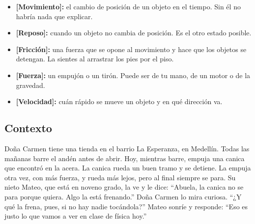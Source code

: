\documentclass[
  spanish,
  letterpaper,
  12pt,
  oneside,
  open=any,
  DIV=15]{scrbook}
\providecommand{\tightlist}{%
  \setlength{\itemsep}{0pt}\setlength{\parskip}{0pt}}
\begin{document}
\begin{tcolorbox}[enhanced jigsaw, arc=.35mm, bottomrule=.15mm, bottomtitle=1mm, breakable, colback=white, colbacktitle=quarto-callout-tip-color!10!white, colframe=quarto-callout-tip-color-frame, coltitle=black, left=2mm, leftrule=.75mm, opacityback=0, opacitybacktitle=0.6, rightrule=.15mm, title=\textcolor{quarto-callout-tip-color}{\faLightbulb}\hspace{0.5em}{Apoyo Procedimental (Vocabulario Clave)}, titlerule=0mm, toprule=.15mm, toptitle=1mm]

\begin{itemize}
\tightlist
\item
  \textbf{{[}Movimiento{]}:} el cambio de posición de un objeto en el
  tiempo. Sin él no habría nada que explicar.
\item
  \textbf{{[}Reposo{]}:} cuando un objeto no cambia de posición. Es el
  otro estado posible.
\item
  \textbf{{[}Fricción{]}:} una fuerza que se opone al movimiento y hace
  que los objetos se detengan. La sientes al arrastrar los pies por el
  piso.
\item
  \textbf{{[}Fuerza{]}:} un empujón o un tirón. Puede ser de tu mano, de
  un motor o de la gravedad.
\item
  \textbf{{[}Velocidad{]}:} cuán rápido se mueve un objeto y en qué
  dirección va.
\end{itemize}

\end{tcolorbox}

\subsection{Contexto}\label{contexto}

Doña Carmen tiene una tienda en el barrio La Esperanza, en Medellín.
Todas las mañanas barre el andén antes de abrir. Hoy, mientras barre,
empuja una canica que encontró en la acera. La canica rueda un buen
tramo y se detiene. La empuja otra vez, con más fuerza, y rueda más
lejos, pero al final siempre se para. Su nieto Mateo, que está en noveno
grado, la ve y le dice: ``Abuela, la canica no se para porque quiera.
Algo la está frenando.'' Doña Carmen lo mira curiosa. ``¿Y qué la frena,
pues, si no hay nadie tocándola?'' Mateo sonríe y responde: ``Eso es
justo lo que vamos a ver en clase de física hoy.''
\end{document}
